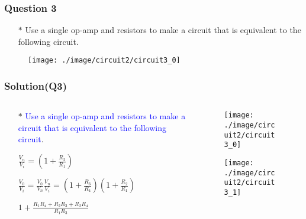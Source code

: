 \documentclass{beamer}
\newcommand{\blue}[1]{\textcolor{blue}{#1}}
\begin{document}

\begin{frame}
\frametitle{Question 3}

\begin{itemize} \itemsep1pt \parskip0pt 
  \item[$\ast$] Use a single op-amp and resistors to make a circuit that is equivalent to the following circuit.
\end{itemize}



\begin{figure}[H]
  \label{epi_circuit3}
  \centering
  \texttt{[image: ./image/circuit2/circuit3\_0]}
\end{figure}


\end{frame}


\begin{frame}
\frametitle{Solution(Q3)}
\begin{columns}
\begin{column}{6cm}
\begin{itemize} \itemsep1pt \parskip0pt 
  \item[$\ast$] \blue{Use a single op-amp and resistors to make a circuit that is equivalent to the following circuit}.
\end{itemize}

\begin{itemize} \itemsep1pt \parskip0pt 
  \item[] $\frac{V_n}{V_i} = (1+\frac{R_2}{R_1})$
  \item[] $\frac{V_0}{V_i} = \frac{V_0}{V_n}\frac{V_n}{V_i} = (1+\frac{R_3}{R_4})(1+\frac{R_2}{R_1})$
  \item[] $1 + \frac{R_1R_4+R_2R_3+R_2R_4}{R_1R_3}$
\end{itemize}


\end{column}

\begin{column}{6cm}
\begin{figure}[H]
  \centering
  \texttt{[image: ./image/circuit2/circuit3\_0]}
\end{figure}

\begin{figure}[H]
  \centering
  \texttt{[image: ./image/circuit2/circuit3\_1]}
\end{figure}

\end{column}
\end{columns}

\end{frame}
\end{document}
